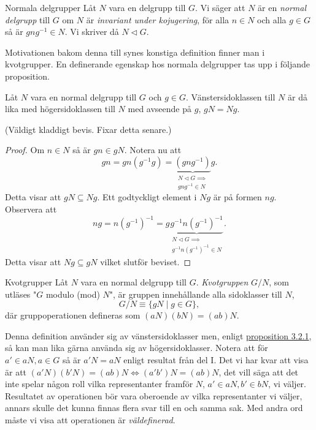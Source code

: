 \documentclass{article}
\theoremstyle{definition}
\begin{document}
\begin{mydef}{Normala delgrupper}{}
  Låt $N$ vara en delgrupp till $G$. Vi säger att $N$ är 
  en \textit{normal delgrupp} till $G$ om $N$ är 
  \textit{invariant under kojugering}, för alla $n \in N$ och 
  alla $g \in G$ så är $gng^{-1} \in N$. Vi skriver då $N \triangleleft G.$
\end{mydef}
Motivationen bakom denna till synes konstiga definition finner man i kvotgrupper. 
En definerande egenskap hos normala delgrupper tas upp i följande proposition.

\hypertarget{prop1}{}
\begin{myprop}{}{}
  Låt $N$ vara en normal delgrupp till $G$ och $g \in G$. Vänstersidoklassen till $N$ är då lika med högersidoklassen till $N$ med avseende på $g$, 
  $gN = Ng.$
\end{myprop}
(Väldigt kladdigt bevis. Fixar detta senare.)
\begin{proof}
  Om $n \in N$ så är $gn \in gN$. Notera nu att 
  \begin{equation*}
    gn = gn(g^{-1}g) = \underbrace{(gng^{-1})}_{ \substack{N \triangleleft G  \implies \\ gng^{-1} \in N}} g.
  \end{equation*}
  Detta visar att $gN \subseteq Ng.$ Ett godtyckligt element i $Ng$ är på formen $ng$. Observera att 
  \begin{equation*}
    ng = n(g^{-1})^{-1} = g \underbrace{g^{-1} {n(g^{-1})^{-1}}}_{\substack{N \triangleleft G  \implies \\ g^{-1} {n(g^{-1})^{-1} \in N}}}.
  \end{equation*}
  Detta visar att $Ng \subseteq gN$ vilket slutför beviset.
\end{proof}

\begin{mydef}{Kvotgrupper}{}
  Låt $N$ vara en normal delgrupp till $G$. \textit{Kvotgruppen} $G/N$, som utläses "$G$ modulo (mod) $N$", är gruppen innehållande alla 
  sidoklasser till $N$, 
  \[G/N \equiv \{gN \; | \; g \in G\},\]
  där gruppoperationen defineras som $(aN) (bN) = (ab)N$. 
\end{mydef}
Denna definition använder sig av vänstersidoklasser men, enligt \hyperlink{prop1}{proposition 3.2.1}, så kan man lika gärna använda sig 
av högersidoklasser. Notera att för $a' \in aN, a \in G$ så är $a'N = aN$ enligt resultat från del I. Det vi har kvar att visa är att $(a'N) (b'N) = (ab)N
\iff (a'b')N = (ab)N$, det vill säga att det inte spelar någon roll vilka representanter framför $N$, $a' \in aN, b' \in bN$, vi väljer. Resultatet av 
operationen bör vara oberoende av vilka representanter vi väljer, annars skulle det kunna finnas flera svar till en och samma sak. Med 
andra ord måste vi visa att operationen är \textit{väldefinerad}.
\end{document}
